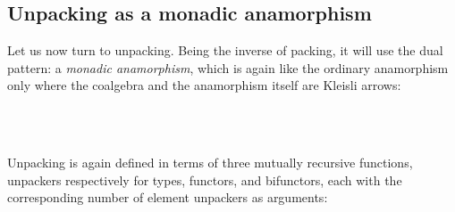 \documentclass[fleqn,runningheads]{llncs}
\begin{document}
\subsection{Unpacking as a monadic anamorphism}

Let us now turn to unpacking. Being the inverse of packing, it will use the dual pattern: a \emph{monadic anamorphism}, which is again like the ordinary anamorphism only where the coalgebra and the anamorphism itself are Kleisli arrows:
\begin{AgdaAlign}
\begin{code}%
\>[0]\<%
\\
\>[0][@{}l@{\AgdaIndent{0}}]%
\>[2]\AgdaSymbol{\{-\#}\AgdaSpace{}%
\AgdaSpace{}%
\AgdaSymbol{\#-\}}\<%
\\
%
\>[2]\AgdaSpace{}%
\AgdaSymbol{:}%
\>[10]\AgdaSymbol{(}\AgdaSpace{}%
\AgdaSymbol{:}\AgdaSpace{}%
\AgdaSymbol{)}\AgdaSpace{}%
\AgdaSpace{}%
\AgdaSymbol{(}\AgdaSpace{}%
\AgdaSpace{}%
\AgdaSpace{}%
\AgdaSymbol{(}\AgdaOperator{\AgdaFunction{[[}}\AgdaSpace{}%
\AgdaSpace{}%
\AgdaOperator{\AgdaFunction{]]B}}\AgdaSpace{}%
\AgdaSpace{}%
\AgdaSymbol{))}\AgdaSpace{}%
\AgdaSpace{}%
\AgdaSpace{}%
\AgdaSpace{}%
\AgdaSpace{}%
\AgdaSymbol{(}\AgdaOperator{\AgdaFunction{[[}}\AgdaSpace{}%
\AgdaSpace{}%
\AgdaSpace{}%
\AgdaOperator{\AgdaFunction{]]F}}\AgdaSpace{}%
\AgdaSymbol{)}\<%
\end{code}
Unpacking is again defined in terms of three mutually recursive functions, unpackers respectively for types, functors, and bifunctors, each with the corresponding number of element unpackers as arguments:
\begin{code}%
%
\>[2]%
\>[11]\AgdaSymbol{:}%
\>[14]\AgdaSymbol{(}\AgdaSpace{}%
\AgdaSymbol{:}\AgdaSpace{}%
\AgdaSymbol{)}%
\>[31]%
\>[41]\AgdaSpace{}%
\AgdaOperator{\AgdaFunction{[[}}\AgdaSpace{}%
\AgdaSpace{}%
\AgdaOperator{\AgdaFunction{]]T}}\<%
\\
%
\>[2]%
\>[11]\AgdaSymbol{:}%
\>[14]\AgdaSymbol{(}\AgdaSpace{}%
\AgdaSymbol{:}\AgdaSpace{}%
\AgdaSymbol{)}%

\end{code}
\end{AgdaAlign}
\end{document}
